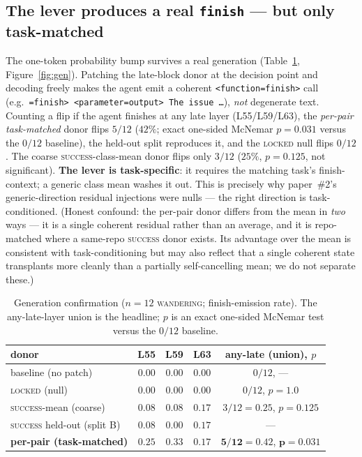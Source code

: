 \documentclass[11pt]{article}
\begin{document}
\subsection{The lever produces a real \texttt{finish} --- but only task-matched}
The one-token probability bump survives a real generation (Table~\ref{tab:gen}, Figure~\ref{fig:gen}). Patching the late-block donor at the decision point and decoding freely makes the agent emit a coherent \texttt{<function=finish>} call (e.g.\ \texttt{=finish> <parameter=output> The issue \dots}), \emph{not} degenerate text. Counting a flip if the agent finishes at any late layer (L55/L59/L63), the \emph{per-pair task-matched} donor flips $5/12$ ($42\%$; exact one-sided McNemar $p=0.031$ versus the $0/12$ baseline), the held-out split reproduces it, and the \textsc{locked} null flips $0/12$. The coarse \textsc{success}-class-mean donor flips only $3/12$ ($25\%$, $p=0.125$, not significant). \textbf{The lever is task-specific}: it requires the matching task's finish-context; a generic class mean washes it out. This is precisely why paper~\#2's generic-direction residual injections were nulls \cite{residual_nulls} --- the right direction is task-conditioned. (Honest confound: the per-pair donor differs from the mean in \emph{two} ways --- it is a single coherent residual rather than an average, and it is repo-matched where a same-repo \textsc{success} donor exists. Its advantage over the mean is consistent with task-conditioning but may also reflect that a single coherent state transplants more cleanly than a partially self-cancelling mean; we do not separate these.)

\begin{table}[h]
\centering
\caption{Generation confirmation ($n=12$ \textsc{wandering}; finish-emission rate). The any-late-layer union is the headline; $p$ is an exact one-sided McNemar test versus the $0/12$ baseline.}
\label{tab:gen}
\begin{tabular}{lcccc}
\toprule
donor & L55 & L59 & L63 & any-late (union), $p$ \\
\midrule
baseline (no patch) & $0.00$ & $0.00$ & $0.00$ & $0/12$, --- \\
\textsc{locked} (null) & $0.00$ & $0.00$ & $0.00$ & $0/12$, $p=1.0$ \\
\textsc{success}-mean (coarse) & $0.08$ & $0.08$ & $0.17$ & $3/12=0.25$, $p=0.125$ \\
\textsc{success} held-out (split B) & $0.08$ & $0.00$ & $0.17$ & --- \\
\textbf{per-pair (task-matched)} & $\mathbf{0.25}$ & $\mathbf{0.33}$ & $0.17$ & $\mathbf{5/12=0.42}$, $\mathbf{p=0.031}$ \\
\bottomrule
\end{tabular}
\end{table}
\end{document}
